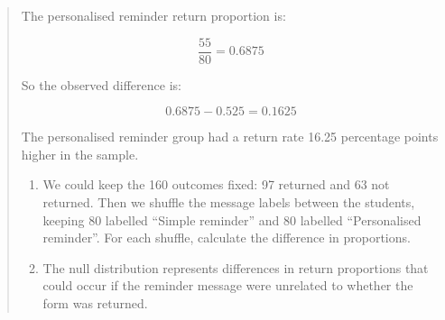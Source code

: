 \documentclass[
  letterpaper,
  DIV=11,
  numbers=noendperiod]{scrreprt}
\begin{document}
\begin{tcolorbox}
\begin{quote}
The personalised reminder return proportion is:

\[\frac{55}{80} = 0.6875\]

So the observed difference is:

\[0.6875 - 0.525 = 0.1625\]

The personalised reminder group had a return rate 16.25 percentage
points higher in the sample.

\begin{enumerate}
\def\labelenumi{(\alph{enumi})}
\setcounter{enumi}{1}
\item
  We could keep the 160 outcomes fixed: 97 returned and 63 not returned.
  Then we shuffle the message labels between the students, keeping 80
  labelled ``Simple reminder'' and 80 labelled ``Personalised
  reminder''. For each shuffle, calculate the difference in proportions.
\item
  The null distribution represents differences in return proportions
  that could occur if the reminder message were unrelated to whether the
  form was returned.
\end{enumerate}
\end{quote}

\end{tcolorbox}
\end{document}
